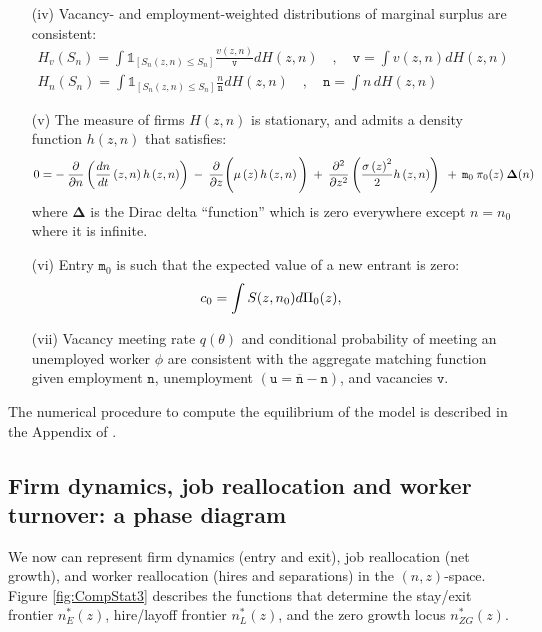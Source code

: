 \begin{itemize}
\item[(iv)] Vacancy- and employment-weighted distributions of marginal surplus are consistent:
\begin{eqnarray*}
H_v(S_n) = \int \mathbb{1}_{[S_n(z,n)\leq S_n]}\frac{v(z,n)}{\mathtt{v}}dH(z,n)\quad,\quad \mathtt{v} = \int v(z,n)dH(z,n) \\
H_n(S_n) = \int \mathbb{1}_{[S_n(z,n)\leq  S_n]} \frac{n}{\mathtt{n}}dH(z,n)\quad,\quad \mathtt{n} = \int n\,dH(z,n)
\end{eqnarray*}
\item[(v)] The measure of firms $H(z,n)$ is stationary, and admits a density function $h(z,n)$ that satisfies:
\vspace*{-.3cm}\begin{equation*}
0=
-\:     \frac{\partial}{\partial n} \left( \frac{dn}{dt}\left(z,n\right)h\left(z,n\right) \right)
\:-\:   \frac{\partial}{\partial z} \Bigg(\mu\left(z\right)h\left(z,n\right) \Bigg)
\:+\:   \frac{\partial^2}{\partial z^2}\left(\frac{\sigma\left(z\right)^{2}}{2}h\left(z,n\right)\right)\:
\:+\:   \mathtt{m}_0\:\pi_0(z)\:\bm{\Delta}(n)
\vspace*{-.3cm}\end{equation*}
where $\bm{\Delta}$ is the Dirac delta ``function'' which is zero everywhere except $n=n_0$ where it is infinite.
\item[(vi)] Entry $\mathtt{m}_0$ is such that the expected value of a new entrant is zero:
\vspace*{-.3cm}\begin{equation*}
c_0 = \small\int S(z,n_0)d\Pi_0(z),
\vspace*{-.3cm}\end{equation*}
\item[(vii)] Vacancy meeting rate $q(\theta)$ and conditional probability of meeting an unemployed worker $\phi$ are consistent with the aggregate matching function given employment $\mathtt{n}$, unemployment $\left(\mathtt{u} = \overline{\mathtt{n}} - \mathtt{n}\right)$, and vacancies $\mathtt{v}$.
\end{itemize}
\noindent
The numerical procedure to compute the equilibrium of the model is described in the Appendix of \citet{BEMVworkingpaper}.

\subsection{Firm dynamics, job reallocation and worker turnover: a phase diagram}
We now can represent firm dynamics (entry and exit), job reallocation (net growth), and worker reallocation (hires and separations) in the $(n,z)$-space.
Figure \ref{fig:CompStat3} describes the functions that determine the stay/exit frontier $n^\ast_E(z)$, hire/layoff frontier $n^\ast_L(z)$, and the zero growth locus $n^{\ast}_{ZG}(z)$.

